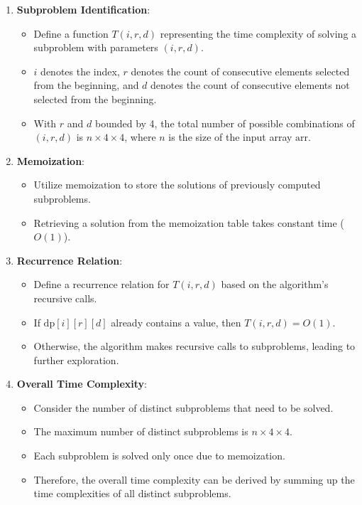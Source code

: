 \documentclass[8pt]{article}
\begin{document}
\begin{enumerate}
    \item \textbf{Subproblem Identification}:
    \begin{itemize}
        \item Define a function \( T(i, r, d) \) representing the time complexity of solving a subproblem with parameters \( (i, r, d) \).
        \item \( i \) denotes the index, \( r \) denotes the count of consecutive elements selected from the beginning, and \( d \) denotes the count of consecutive elements not selected from the beginning.
        \item With \( r \) and \( d \) bounded by 4, the total number of possible combinations of \( (i, r, d) \) is \( n \times 4 \times 4 \), where \( n \) is the size of the input array \( \text{arr} \).
    \end{itemize}
    
    \item \textbf{Memoization}:
    \begin{itemize}
        \item Utilize memoization to store the solutions of previously computed subproblems.
        \item Retrieving a solution from the memoization table takes constant time (\( O(1) \)).
    \end{itemize}
    
    \item \textbf{Recurrence Relation}:
    \begin{itemize}
        \item Define a recurrence relation for \( T(i, r, d) \) based on the algorithm's recursive calls.
        \item If \( \text{dp}[i][r][d] \) already contains a value, then \( T(i, r, d) = O(1) \).
        \item Otherwise, the algorithm makes recursive calls to subproblems, leading to further exploration.
    \end{itemize}
    
    \item \textbf{Overall Time Complexity}:
    \begin{itemize}
        \item Consider the number of distinct subproblems that need to be solved.
        \item The maximum number of distinct subproblems is \( n \times 4 \times 4 \).
        \item Each subproblem is solved only once due to memoization.
        \item Therefore, the overall time complexity can be derived by summing up the time complexities of all distinct subproblems.
    \end{itemize}
    

\end{enumerate}
\end{document}
